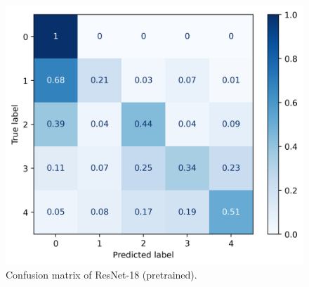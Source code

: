 	\begin{figure}[H]
		\centering
		\includegraphics[scale=0.8]{img/resnet18_confusion_matrix_pretrained.png}
		\caption{Confusion matrix of ResNet-18 (pretrained).}
		\label{resnet18-pretrained-confusion-matrix}
	\end{figure}


